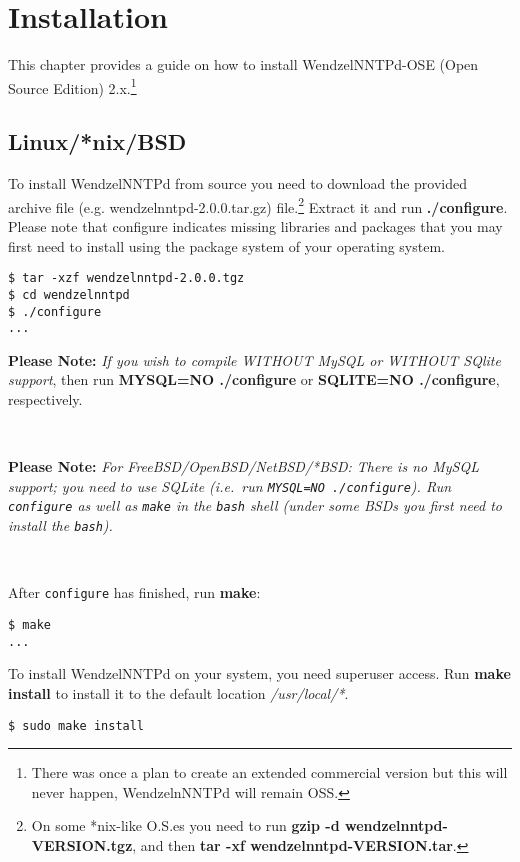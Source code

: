 \chapter{Installation}

This chapter provides a guide on how to install WendzelNNTPd-OSE (Open Source Edition) 2.x.\footnote{There was once a plan to create an extended commercial version but this will never happen, WendzelnNNTPd will remain OSS.}

\section{Linux/*nix/BSD}

To install WendzelNNTPd from source you need to download the provided archive file (e.g. wendzelnntpd-2.0.0.tar.gz) file.\footnote{On some *nix-like O.S.es you need to run {\bf gzip -d wendzelnntpd-VERSION.tgz}, and then {\bf tar -xf wendzelnntpd-VERSION.tar}.} Extract it and run {\bf ./configure}. Please note that configure indicates missing libraries and packages that you may first need to install using the package system of your operating system.

\begin{verbatim}
$ tar -xzf wendzelnntpd-2.0.0.tgz
$ cd wendzelnntpd
$ ./configure
...
\end{verbatim}

{\bf Please Note:} {\it If you wish to compile WITHOUT MySQL or WITHOUT SQlite support}, then run {\bf MYSQL=NO ./configure} or {\bf SQLITE=NO ./configure}, respectively.

~

{\bf Please Note:} {\it For FreeBSD/OpenBSD/NetBSD/*BSD: There is no MySQL support; you need to use SQLite (i.e.\ run \texttt{MYSQL=NO ./configure}). Run \texttt{configure} as well as \texttt{make} in the \texttt{bash} shell (under some BSDs you first need to install the \texttt{bash}).}

~

After \texttt{configure} has finished, run {\bf make}:

\begin{verbatim}
$ make
...
\end{verbatim}

To install WendzelNNTPd on your system, you need superuser access. Run {\bf make install} to install it to the default location {\it /usr/local/*}.

\begin{verbatim}
$ sudo make install
\end{verbatim}


